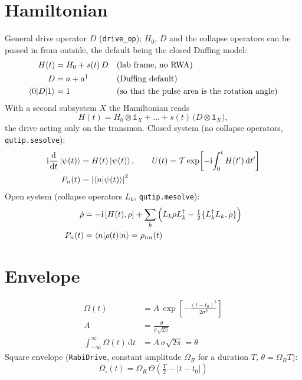 \documentclass[11pt]{article}
\newcommand{\dd}{\mathrm{d}}
\newcommand{\ii}{\mathrm{i}}
\newcommand{\ad}{a^{\dagger}}
\newcommand{\id}{\mathbb{1}}
\begin{document}
\section*{Hamiltonian}
General drive operator $D$ (\texttt{drive\_op}); $H_0$, $D$ and the collapse operators can be
passed in from outside, the default being the closed Duffing model:
\begin{align}
  H(t) &= H_0 + s(t)\,D && \text{(lab frame, no RWA)} \\
  D &= a + \ad && \text{(Duffing default)} \\
  \braket{0|D|1} &= 1 && \text{(so that the pulse area is the rotation angle)}
\end{align}
With a second subsystem $X$ the Hamiltonian reads
\begin{equation}
  H(t) = H_0 \otimes \id_X + \ldots + s(t)\,\big(D \otimes \id_X\big),
\end{equation}
the drive acting only on the transmon.
Closed system (no collapse operators, \texttt{qutip.sesolve}):
\begin{align}
  \ii \frac{\dd}{\dd t}\ket{\psi(t)} &= H(t)\ket{\psi(t)}, \qquad
  U(t) = \mathcal{T}\exp\!\left[-\ii\!\int_0^{t} H(t')\,\dd t'\right] \\
  P_n(t) &= \left|\braket{n|\psi(t)}\right|^2
\end{align}
Open system (collapse operators $L_k$, \texttt{qutip.mesolve}):
\begin{align}
  \dot\rho &= -\ii\,[H(t), \rho] + \sum_k \Big(L_k\rho L_k^{\dagger} - \tfrac12\{L_k^{\dagger}L_k, \rho\}\Big) \\
  P_n(t) &= \braket{n|\rho(t)|n} = \rho_{nn}(t)
\end{align}

\section*{Envelope}
\begin{align}
  \Omega(t) &= A\,\exp\!\left[-\frac{(t-t_0)^2}{2\sigma^2}\right] \\
  A &= \frac{\theta}{\sigma\sqrt{2\pi}} \\
  \int_{-\infty}^{\infty} \Omega(t)\,\dd t &= A\,\sigma\sqrt{2\pi} = \theta
\end{align}
Square envelope (\texttt{RabiDrive}, constant amplitude $\Omega_R$ for a duration $T$, $\theta = \Omega_R T$):
\begin{equation}
  \Omega_{\square}(t) = \Omega_R\,\Theta\!\left(\tfrac{T}{2} - |t - t_0|\right)
\end{equation}
\end{document}
